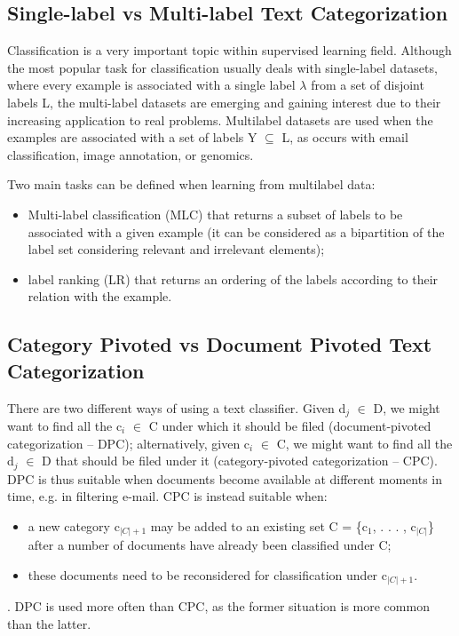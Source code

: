 \subsection{Single-label vs Multi-label Text Categorization}
Classification is a very important topic within supervised learning field. Although the most popular task for classification usually deals with single-label datasets, where every example
is associated with a single label $\lambda$ from a set of disjoint labels L, the multi-label datasets are emerging and gaining interest due to their increasing application to real problems. Multilabel datasets are used when the examples are associated with a set of labels Y $\subseteq$ L, as occurs with email classification, image annotation, or genomics.

Two main tasks can be defined when learning from multilabel
data: 
\begin{itemize}
\item Multi-label classification (MLC) that returns a subset of labels to be associated with a given example (it can be considered as a bipartition of the label set considering relevant and irrelevant elements);
\item label ranking (LR) that returns an ordering of the labels according to their relation with the example. \cite{Carmona2011}
\end{itemize}

\subsection{Category Pivoted vs Document Pivoted Text Categorization}
There are two different ways of using a text classifier. Given d$_{j}$ $\in$ D, we might want
to find all the c$_{i}$ $\in$ C under which it should be filed (document-pivoted categorization
– DPC); alternatively, given c$_{i}$ $\in$ C, we might want to find all the d$_{j}$ $\in$ D that should be filed under it (category-pivoted categorization – CPC).
DPC is thus suitable when documents become available at different moments in time, e.g. in filtering e-mail. CPC is instead suitable when: 
\begin{itemize}
\item a new category c$_{|C|+1}$ may be added to an existing set C = \{c$_{1}$, . . . , c$_{|C|}$\} after a number of documents have already been classified under C;
\item these documents need to be reconsidered for classification under c$_{|C|+1}$.
\end{itemize}. DPC is used more often than CPC, as the former situation is more common than the latter. \cite{Sebastiani2002}

